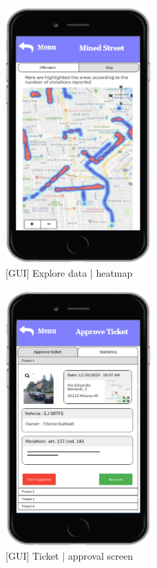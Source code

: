 \begin{figure}[H]
		\centering
      \includegraphics[width=0.5\textwidth]{GUI/MinedStreet.png}
      \caption{[GUI] Explore data | heatmap}   \label{fig:MinedStreet}
\end{figure}


\begin{figure}[H]
		\centering
      \includegraphics[width=0.5\textwidth]{GUI/Ticket.png}
      \caption{[GUI] Ticket | approval screen}   \label{fig:Ticket}
\end{figure}
